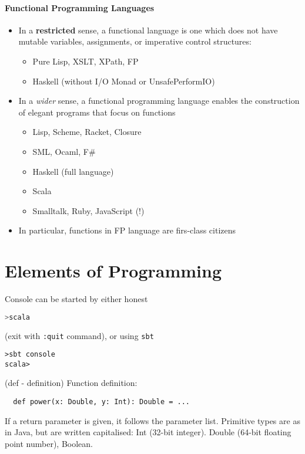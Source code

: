 \documentclass{scrartcl}
\begin{document}
\paragraph{Functional Programming Languages}
\begin{itemize}
\item In a {\bf restricted} sense, a functional language is one which does not
  have mutable variables, assignments, or imperative control structures:
  \begin{itemize}
  \item Pure Lisp, XSLT, XPath, FP
  \item Haskell (without I/O Monad or UnsafePerformIO)
  \end{itemize}
\item In a {\it wider} sense, a functional programming language enables the
  construction of elegant programs that focus on functions
  \begin{itemize}
  \item Lisp, Scheme, Racket, Closure
  \item SML, Ocaml, F\#
  \item Haskell (full language)
  \item Scala
  \item Smalltalk, Ruby, JavaScript (!)
  \end{itemize}
\item In particular, functions in FP language are firs-class citizens
\end{itemize}


\section{Elements of Programming}
\label{sec:Elements}

Console can be started by either honest
\begin{lstlisting}[language=scala, caption=={Plugin function }]
>scala  
\end{lstlisting}

(exit with \verb!:quit! command), or using \verb!sbt!

\begin{lstlisting}
>sbt console
scala>
\end{lstlisting}
(def - definition) Function definition:
\begin{lstlisting}
  def power(x: Double, y: Int): Double = ...
\end{lstlisting}
If a return parameter is given, it follows the parameter list. Primitive types
are as in Java, but are written capitalised: Int (32-bit integer). Double
(64-bit floating point number), Boolean.
\end{document}
